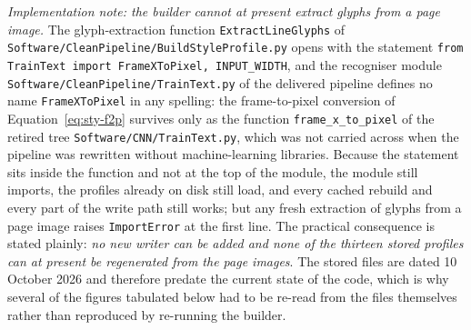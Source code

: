 \emph{Implementation note: the builder cannot at present extract glyphs from a page image.}
The glyph-extraction function \texttt{ExtractLineGlyphs} of \texttt{Software/\allowbreak CleanPipeline/\allowbreak BuildStyleProfile.py} opens with the statement \texttt{from TrainText import FrameXToPixel,\,INPUT\_WIDTH}, and the recogniser module \texttt{Software/\allowbreak CleanPipeline/\allowbreak TrainText.py} of the delivered pipeline defines no name \texttt{FrameXToPixel} in any spelling: the frame-to-pixel conversion of Equation~\ref{eq:sty-f2p} survives only as the function \texttt{frame\_x\_to\_pixel} of the retired tree \texttt{Software/CNN/TrainText.py}, which was not carried across when the pipeline was rewritten without machine-learning libraries.
Because the statement sits inside the function and not at the top of the module, the module still imports, the profiles already on disk still load, and every cached rebuild and every part of the write path still works; but any fresh extraction of glyphs from a page image raises \texttt{ImportError} at the first line.
The practical consequence is stated plainly: \emph{no new writer can be added and none of the thirteen stored profiles can at present be regenerated from the page images}.
The stored files are dated 10 October 2026 and therefore predate the current state of the code, which is why several of the figures tabulated below had to be re-read from the files themselves rather than reproduced by re-running the builder.

